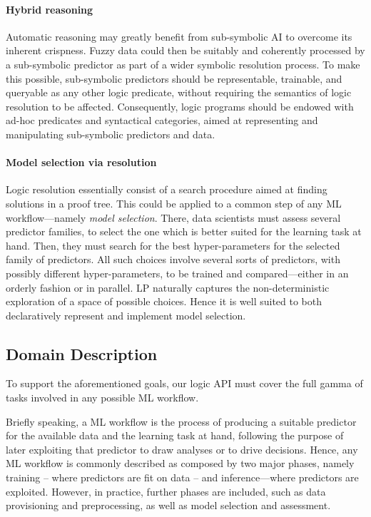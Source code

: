 \documentclass[12pt,a4paper,openright,twoside]{book}
\begin{document}
\paragraph{Hybrid reasoning}

Automatic reasoning may greatly benefit from sub-symbolic AI to overcome its inherent crispness.
%
Fuzzy data could then be suitably and coherently processed by a sub-symbolic predictor as part of a wider symbolic resolution process.
%
To make this possible, sub-symbolic predictors should be representable, trainable, and queryable as any other logic predicate, without requiring the semantics of logic resolution to be affected.
%
Consequently, logic programs should be endowed with ad-hoc predicates and syntactical categories, aimed at representing and manipulating sub-symbolic predictors and data.

\paragraph{Model selection via resolution}

Logic resolution essentially consist of a search procedure aimed at finding solutions in a proof tree.
%
This could be applied to a common step of any ML workflow---namely \emph{model selection}.
%
There, data scientists must assess several predictor families, to select the one which is better suited for the learning task at hand.
%
Then, they must search for the best hyper-parameters for the selected family of predictors.
%
All such choices involve several sorts of predictors, with possibly different hyper-parameters, to be trained and compared---either in an orderly fashion or in parallel.
%
LP naturally captures the non-deterministic exploration of a space of possible choices.
%
Hence it is well suited to both declaratively represent and implement model selection.

\subsection{Domain Description}\label{ssec:analysis}

To support the aforementioned goals,
our logic API must cover the full gamma of tasks involved in any possible ML workflow.

Briefly speaking, a ML workflow is the process of producing a suitable predictor for the available data and the learning task at hand, following the purpose of later exploiting that predictor to draw analyses or to drive decisions.
%
Hence, any ML workflow is commonly described as composed by two major phases, namely training -- where predictors are fit on data -- and inference---where predictors are exploited.
%
However, in practice, further phases are included, such as data provisioning and preprocessing, as well as model selection and assessment.
\end{document}

